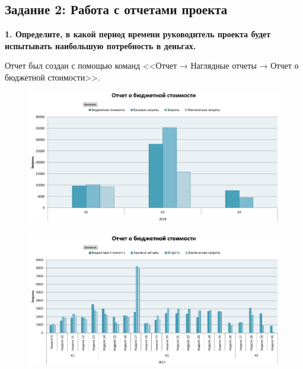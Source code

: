 \newpage

\subsection*{Задание 2: Работа с отчетами проекта}

\textbf{1. Определите, в какой период времени руководитель проекта будет
испытывать наибольшую потребность в деньгах.}

Отчет был создан с помощью команд <<Отчет → Наглядные отчеты → Отчет о бюджетной стоимости>>.

\begin{figure}[h!]
	\begin{center}
		\includegraphics[scale=0.5]{inc/img/p_4.png}
	\end{center}
	\captionsetup{justification=centering}
	\label{fig:u3}
\end{figure}

\begin{figure}[h!]
	\begin{center}
		\includegraphics[scale=0.6]{inc/img/p_6.png}
	\end{center}
	\captionsetup{justification=centering}
	\label{fig:u3}
\end{figure}

